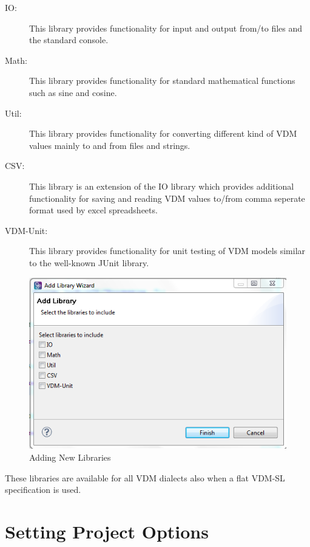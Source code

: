 \documentclass{overturerepchap}
\begin{document}
\begin{description}
\item[IO:] This library provides functionality for input and output
  from/to files and the standard console. 
\item[Math:] This library provides functionality for standard
  mathematical functions such as sine and cosine.
\item[Util:] This library provides functionality for converting
  different kind of VDM values mainly to and from files and strings.
\item[CSV:] This library is an extension of the IO library which
  provides additional functionality for saving and reading VDM values
  to/from comma seperate format used by excel spreadsheets. 
\item[VDM-Unit:] This library provides functionality for unit testing
  of VDM models similar to the well-known JUnit library.
\end{description}

\begin{figure}[!htb]
	\begin{center}
	  \includegraphics[scale=0.8]{figures/NewLibraries}
	  \caption[Adding New Libraries]{Adding New Libraries}
	  \label{fig:NewLibraries}
	\end{center}
\end{figure}

These libraries are available for all VDM dialects also when a flat
VDM-SL specification is used.

\section{Setting Project Options}\label{subsec:options}
\end{document}
